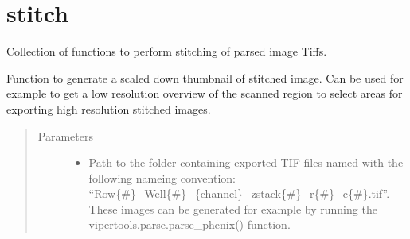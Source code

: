 \documentclass[a4paper,10pt,english,openany,oneside]{sphinxmanual}
\begin{document}
\label{\detokenize{pages/modules:module-vipertools.stitch}}

\section{stitch}
\label{\detokenize{pages/modules:stitch}}
\sphinxAtStartPar
Collection of functions to perform stitching of parsed image Tiffs.

\begin{fulllineitems}
\label{\detokenize{pages/modules:vipertools.stitch.generate_stitched}}
\sphinxAtStartPar
Function to generate a scaled down thumbnail of stitched image. Can be used for example to
get a low resolution overview of the scanned region to select areas for exporting high resolution
stitched images.
\begin{quote}\begin{description}
\item[{Parameters}] \leavevmode\begin{itemize}
\item {} 
\sphinxAtStartPar
{} \textendash{} Path to the folder containing exported TIF files named with the following nameing convention: “Row\{\#\}\_Well\{\#\}\_\{channel\}\_zstack\{\#\}\_r\{\#\}\_c\{\#\}.tif”.
These images can be generated for example by running the vipertools.parse.parse\_phenix() function.


\end{itemize}
\end{description}
\end{quote}
\end{fulllineitems}
\end{document}
